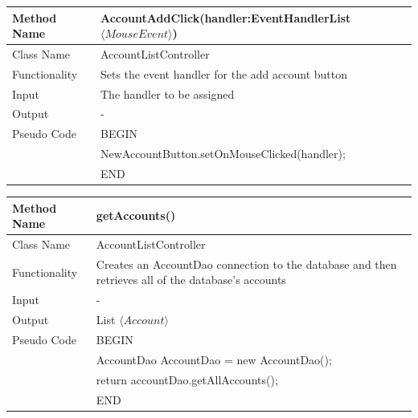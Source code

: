 \documentclass[12pt]{article}
\begin{document}
\begin{tabular}{ |p{3cm}||p{\colWidth}|  }
	\hline
	Method Name & AccountAddClick(handler:EventHandlerList$\langle MouseEvent \rangle$)\\
	\hline
	Class Name & AccountListController\\
	\hline
	Functionality & Sets the event handler for the add account button\\
	\hline
	Input & The handler to be assigned\\
	\hline
	Output & -\\
	\hline
	Pseudo Code & BEGIN\\
	& NewAccountButton.setOnMouseClicked(handler); \\
	& END\\
	\hline
\end{tabular} 

\begin{tabular}{ |p{3cm}||p{\colWidth}|  }
	\hline
	Method Name & getAccounts()\\
	\hline
	Class Name & AccountListController\\
	\hline
	Functionality & Creates an AccountDao connection to the database and then retrieves all of the database's accounts \\
	\hline
	Input & -\\
	\hline
	Output & List $\langle Account \rangle$\\
	\hline
	Pseudo Code & BEGIN\\
	& 		AccountDao AccountDao = new AccountDao();\\
	& 		return accountDao.getAllAccounts(); \\
	& END\\
	\hline
\end{tabular} 
\end{document}

